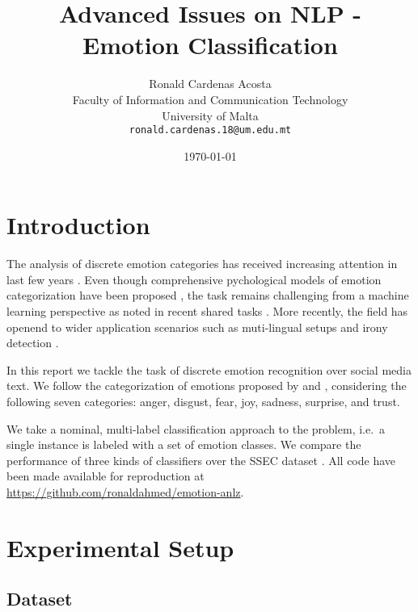\documentclass[11pt,a4paper]{article}
\title{Advanced Issues on NLP - Emotion Classification}
\author{Ronald Cardenas Acosta\\
  Faculty of Information and Communication Technology \\
  University of Malta \\
  {\tt ronald.cardenas.18@um.edu.mt} \\}
\date{\today}
\begin{document}
\maketitle

\section{Introduction}

The analysis of discrete emotion categories has received increasing attention in last few years \cite{alm2005emotions,aman2007identifying,dodds2011temporal}.
Even though comprehensive pychological models of emotion categorization have been proposed \cite{ekman1999basic, plutchik2001nature}, the task remains challenging from a machine learning perspective as noted in recent shared tasks \cite{mohammad2016semeval}. More recently, the field has openend to wider application scenarios such as muti-lingual setups \cite{barbieri2018semeval} and irony detection \cite{van2018semeval}.

In this report we tackle the task of discrete emotion recognition over social media text.
We follow the categorization of emotions proposed by \citet{ekman1999basic} and \citet{plutchik2001nature}, considering the following seven categories:
anger, disgust, fear, joy, sadness, surprise, and trust.

We take a nominal, multi-label classification approach to the problem, i.e.\ a single instance is labeled with a set of emotion classes.
We compare the performance of three kinds of classifiers over the SSEC dataset \cite{schuff2017annotation}.
All code have been made available for reproduction at \url{https://github.com/ronaldahmed/emotion-anlz}.
%
%


\section{Experimental Setup}

\subsection{Dataset}
\end{document}

